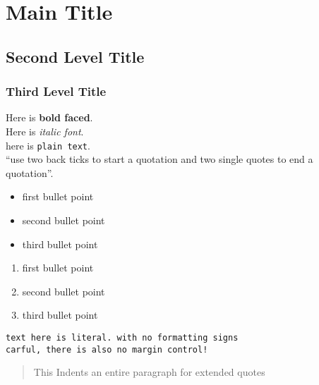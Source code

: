 \documentclass{article}\usepackage[]{graphicx}\usepackage[]{color}
\begin{document}


\section*{Main Title}

\subsection*{Second Level Title}

\subsubsection*{Third Level Title}


Here is \textbf{bold faced}.\\
Here is \textit{italic font}.\\
here is \texttt{plain text}.\\

``use two back ticks to start a quotation and two single quotes to end a quotation''.

\begin{itemize}
  \item first bullet point
  \item second bullet point
  \item third bullet point
\end{itemize}

\begin{enumerate}
  \item first bullet point
  \item second bullet point
  \item third bullet point
\end{enumerate}

\begin{verbatim}
text here is literal. with no formatting signs
carful, there is also no margin control!
\end{verbatim}

\begin{quote}
This Indents an entire paragraph for extended quotes
\end{quote}

\end{document}
